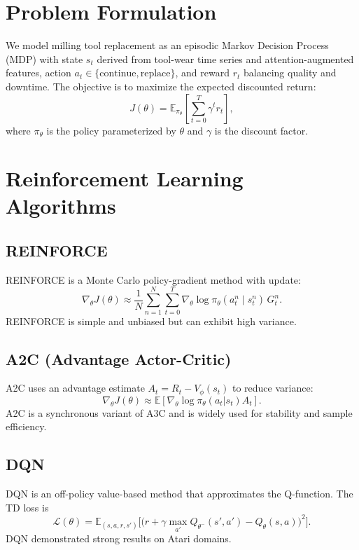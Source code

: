 \documentclass[11pt]{article}
\begin{document}
\section{Problem Formulation}
We model milling tool replacement as an episodic Markov Decision Process (MDP) with state $s_t$ derived from tool-wear time series and attention-augmented features, action $a_t \in \{\text{continue},\text{replace}\}$, and reward $r_t$ balancing quality and downtime. The objective is to maximize the expected discounted return:
\begin{equation}
J(\theta) = \mathbb{E}_{\pi_\theta}\left[\sum_{t=0}^{T} \gamma^t r_t\right],
\end{equation}
where $\pi_\theta$ is the policy parameterized by $\theta$ and $\gamma$ is the discount factor.

\section{Reinforcement Learning Algorithms}
\subsection{REINFORCE}
REINFORCE is a Monte Carlo policy-gradient method with update:
\begin{equation}
\nabla_\theta J(\theta) \approx \frac{1}{N} \sum_{n=1}^{N} \sum_{t=0}^{T} \nabla_\theta \log \pi_\theta(a_t^n \mid s_t^n)\, G_t^n.
\end{equation}
REINFORCE is simple and unbiased but can exhibit high variance. \cite{Williams1992}

\subsection{A2C (Advantage Actor-Critic)}
A2C uses an advantage estimate $A_t = R_t - V_\phi(s_t)$ to reduce variance:
\begin{equation}
\nabla_\theta J(\theta) \approx \mathbb{E}[\nabla_\theta \log \pi_\theta(a_t|s_t) A_t].
\end{equation}
A2C is a synchronous variant of A3C and is widely used for stability and sample efficiency. \cite{Mnih2016A3C}

\subsection{DQN}
DQN is an off-policy value-based method that approximates the Q-function. The TD loss is
\begin{equation}
\mathcal{L}(\theta) = \mathbb{E}_{(s,a,r,s')}\Big[\big(r + \gamma \max_{a'} Q_{\theta^-}(s',a') - Q_\theta(s,a)\big)^2\Big].
\end{equation}
DQN demonstrated strong results on Atari domains. \cite{Mnih2015DQN}
\end{document}
